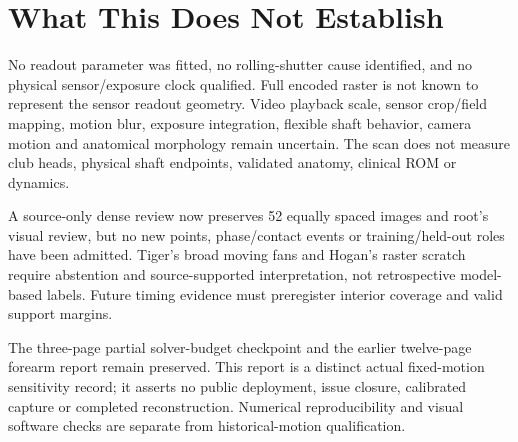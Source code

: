 \documentclass[11pt,letterpaper]{article}
\begin{document}
\section{What This Does Not Establish}
No readout parameter was fitted, no rolling-shutter cause identified, and no
physical sensor/exposure clock qualified. Full encoded raster is not known to
represent the sensor readout geometry. Video playback scale, sensor crop/field
mapping, motion blur, exposure integration, flexible shaft behavior, camera motion
and anatomical morphology remain uncertain. The scan does not measure club heads,
physical shaft endpoints, validated anatomy, clinical ROM or dynamics.

A source-only dense review now preserves 52 equally spaced images and root's visual
review, but no new points, phase/contact events or training/held-out roles have been
admitted. Tiger's broad moving fans and Hogan's raster scratch require abstention
and source-supported interpretation, not retrospective model-based labels. Future
timing evidence must preregister interior coverage and valid support margins.

The three-page partial solver-budget checkpoint and the earlier twelve-page
forearm report remain preserved. This report is a distinct actual fixed-motion
sensitivity record; it asserts no public deployment, issue closure, calibrated
capture or completed reconstruction. Numerical reproducibility and visual software
checks are separate from historical-motion qualification.
\end{document}
